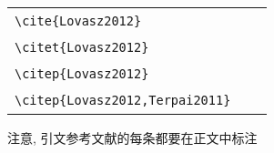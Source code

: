 {
\noindent
\begin{tabular}{@{}l@{$\Rightarrow$}l@{}}
  \verb|\cite{Lovasz2012}|                & ~~\cite{Lovasz2012}                \\
  \verb|\citet{Lovasz2012}|               & ~~\citet{Lovasz2012}               \\
  \verb|\citep{Lovasz2012}|               & ~~\citep{Lovasz2012}               \\
  \verb|\citep{Lovasz2012,Terpai2011}|    & ~~\citep{Lovasz2012,Terpai2011} \\
\end{tabular}}


注意, 引文参考文献的每条都要在正文中标注
\cite{Balogh-Clemen2021,Cioaba2021,dupont1974bone,jianduju1994,%
jiangxizhou1980,Lovasz2012,Nosal1970,scitor2000project,Terpai2011,%
tushuguan1957tushuguanxue,TuXuWang1987}